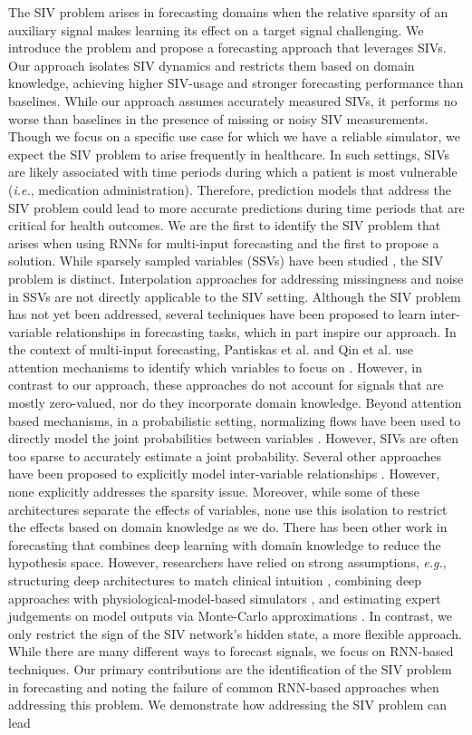 \documentclass[letterpaper]{article}
\begin{document}
The SIV problem arises in forecasting domains when the relative sparsity of an auxiliary signal makes learning its effect on a target signal challenging. We introduce the problem and propose a forecasting approach that leverages SIVs. Our approach isolates SIV dynamics and restricts them based on domain knowledge, achieving higher SIV-usage and stronger forecasting performance than baselines. While our approach assumes accurately measured SIVs, it performs no worse than baselines in the presence of missing or noisy SIV measurements. Though we focus on a specific use case for which we have a reliable simulator, we expect the SIV problem to arise frequently in healthcare. In such settings, SIVs are likely associated with time periods during which a patient is most vulnerable (\textit{i.e.}, medication administration). Therefore, prediction models that address the SIV problem could lead to more accurate predictions during time periods that are critical for health outcomes.  We are the first to identify the SIV problem that arises when using RNNs for multi-input forecasting and the first to propose a solution. While sparsely sampled variables (SSVs) have been studied \cite{missing}, the SIV problem is distinct. Interpolation approaches for addressing missingness and noise in SSVs are not directly applicable to the SIV setting. Although the SIV problem has not yet been addressed, several techniques have been proposed to learn inter-variable relationships in forecasting tasks, which in part inspire our approach. In the context of multi-input forecasting, Pantiskas et al. and Qin et al. use attention mechanisms to identify which variables to focus on \cite{attention1,cnnandatten}. However, in contrast to our approach, these approaches do not account for signals that are mostly zero-valued, nor do they incorporate domain knowledge. Beyond attention based mechanisms, in a probabilistic setting, normalizing flows have been used to directly model the joint probabilities between variables \cite{prob1,prob2}. However, SIVs are often too sparse to accurately estimate a joint probability. Several other approaches have been proposed to explicitly model inter-variable relationships \cite{cnn1,cnn2,cnnandatten,graphresid,sharedmulti}. However, none explicitly addresses the sparsity issue. Moreover, while some of these architectures separate the effects of variables, none use this isolation to restrict the effects based on domain knowledge as we do. There has been other work in forecasting that combines deep learning with domain knowledge to reduce the hypothesis space. However, researchers have relied on strong assumptions, \textit{e.g.}, structuring deep architectures to match clinical intuition \cite{gluexps}, combining deep approaches with physiological-model-based simulators \cite{wild}, and estimating expert judgements on model outputs via Monte-Carlo approximations \cite{domain}. In contrast, we only restrict the sign of the SIV network's hidden state, a more flexible approach.  While there are many different ways to forecast signals, we focus on RNN-based techniques. Our primary contributions are the identification of the SIV problem in forecasting and noting the failure of common RNN-based approaches when addressing this problem. We demonstrate how addressing the SIV problem can lead 
\end{document}
